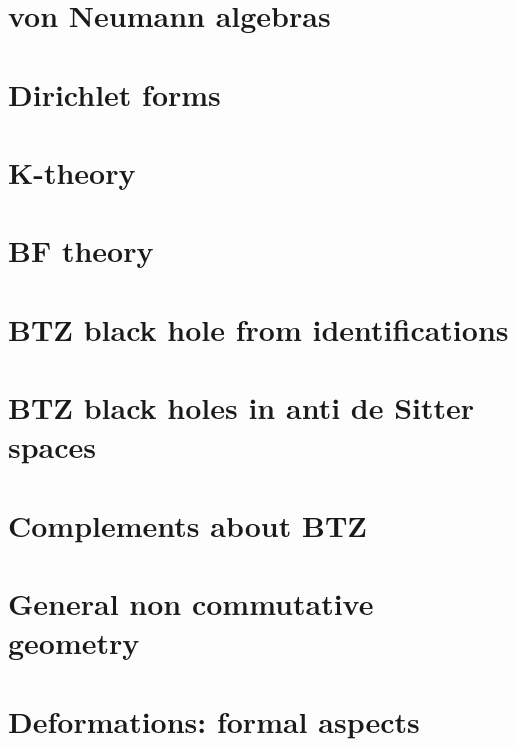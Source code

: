 \chapter{von Neumann algebras}





\chapter{Dirichlet forms}


\chapter{K-theory}


\chapter{BF theory}


\chapter{BTZ black hole from identifications}




\chapter{BTZ black holes in anti de Sitter spaces}                  \label{ChapBHinAdS}
%
%









\chapter{Complements about BTZ}


\chapter{General non commutative geometry}




\chapter{Deformations: formal aspects}          \label{ChapDefo}


